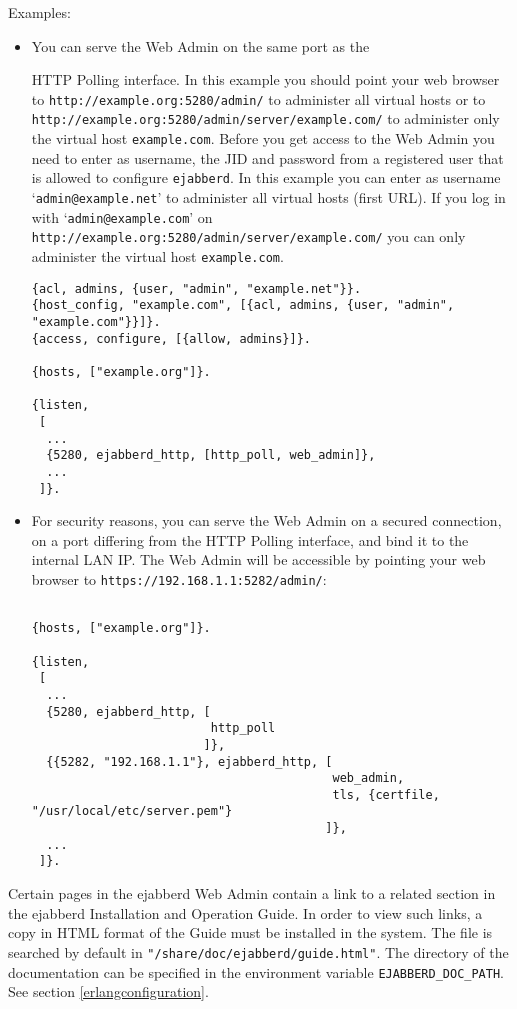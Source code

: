 \documentclass[a4paper,10pt]{book}
\newcommand{\ind}[1]{\begin{latexonly}\index{#1}\end{latexonly}}
\newcommand{\jid}[1]{\texttt{#1}}
\newcommand{\term}[1]{\texttt{#1}}
\newcommand{\ejabberd}{\texttt{ejabberd}}
\begin{document}
Examples:
\begin{itemize}
\item You can serve the Web Admin on the same port as the
  \ind{protocols!XEP-0025: HTTP Polling}HTTP Polling interface. In this example
  you should point your web browser to \verb|http://example.org:5280/admin/| to
  administer all virtual hosts or to
  \verb|http://example.org:5280/admin/server/example.com/| to administer only
  the virtual host \jid{example.com}. Before you get access to the Web Admin
  you need to enter as username, the JID and password from a registered user
  that is allowed to configure \ejabberd{}. In this example you can enter as
  username `\jid{admin@example.net}' to administer all virtual hosts (first
  URL). If you log in with `\jid{admin@example.com}' on \\
  \verb|http://example.org:5280/admin/server/example.com/| you can only
  administer the virtual host \jid{example.com}.
\begin{verbatim}
{acl, admins, {user, "admin", "example.net"}}.
{host_config, "example.com", [{acl, admins, {user, "admin", "example.com"}}]}.
{access, configure, [{allow, admins}]}.

{hosts, ["example.org"]}.

{listen,
 [
  ...
  {5280, ejabberd_http, [http_poll, web_admin]},
  ...
 ]}.
\end{verbatim}
\item For security reasons, you can serve the Web Admin on a secured
  connection, on a port differing from the HTTP Polling interface, and bind it
  to the internal LAN IP. The Web Admin will be accessible by pointing your
  web browser to \verb|https://192.168.1.1:5282/admin/|:
\begin{verbatim}

{hosts, ["example.org"]}.

{listen,
 [
  ...
  {5280, ejabberd_http, [
                         http_poll
                        ]},
  {{5282, "192.168.1.1"}, ejabberd_http, [
                                          web_admin,
                                          tls, {certfile, "/usr/local/etc/server.pem"}
                                         ]},
  ...
 ]}.
\end{verbatim}
\end{itemize}

Certain pages in the ejabberd Web Admin contain a link to a related
section in the ejabberd Installation and Operation Guide.
In order to view such links, a copy in HTML format of the Guide must
be installed in the system.
The file is searched by default in
\term{"/share/doc/ejabberd/guide.html"}.
The directory of the documentation can be specified in
the environment variable \term{EJABBERD\_DOC\_PATH}.
See section \ref{erlangconfiguration}.
\end{document}
